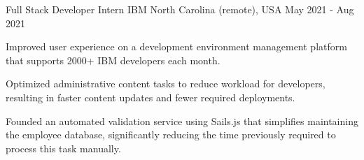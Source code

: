 

\begin{cventries}

  \cventry
    {Full Stack Developer Intern} %
    {IBM} %
    {North Carolina (remote), USA} %
    {May 2021 - Aug 2021} %
    {
      \begin{cvitems} %
        \item {Improved user experience on a development environment management platform that supports 2000+ IBM developers each month.}
        \item {Optimized administrative content tasks to reduce workload for developers, resulting in faster content updates and fewer required deployments.}
        \item {Founded an automated validation service using Sails.js that simplifies maintaining the employee database, significantly reducing the time previously required to process this task manually.}
      \end{cvitems}
    }


\end{cventries}
